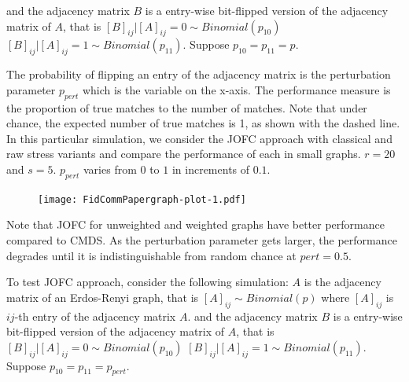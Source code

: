 \documentclass[12pt,oneside,final]{thesis}\usepackage[]{graphicx}\usepackage[]{color}
\begin{document}
   and the adjacency matrix  $B$ is a entry-wise bit-flipped version of the adjacency matrix of $A$, that is
   $\left[B\right]_{ij}|\left[A\right]_{ij}=0 \sim Binomial(p_{10})$ $\left[B\right]_{ij}|\left[A\right]_{ij}=1 \sim Binomial(p_{11})$. Suppose $p_{10}=p_{11}=p$.
  
  The probability of flipping an entry of the adjacency matrix is the perturbation parameter $p_{pert}$ which is the variable on the x-axis. 
  The performance measure is the proportion of true matches to the number of matches. Note that 
  under chance, the expected number of true matches is 1, as shown with the dashed line. In this particular simulation, we consider the JOFC approach with classical and raw stress variants and compare the performance of each in small graphs. $r=20$ and $s=5$. $p_{pert}$ varies from $0$ to $1$ in increments of $0.1$.  
  
\begin{figure}
  \texttt{[image: FidCommPapergraph-plot-1.pdf]}
\end{figure}












Note that JOFC for unweighted and weighted graphs  have better performance compared to CMDS. As the perturbation parameter gets larger, the performance degrades until it is indistinguishable from random chance at $pert=0.5$.

 
  To test JOFC approach, consider the following simulation: $A$ is the adjacency matrix of an Erdos-Renyi graph, that is
  $\left[A\right]_{ij} \sim Binomial(p)$ where $\left[A\right]_{ij}$ is $ij$-th entry of the adjacency matrix  $A$.
   and the adjacency matrix  $B$ is a entry-wise bit-flipped version of the adjacency matrix of $A$, that is
    $\left[B\right]_{ij}|\left[A\right]_{ij}=0 \sim Binomial(p_{10})$ $\left[B\right]_{ij}|\left[A\right]_{ij}=1 \sim Binomial(p_{11})$. Suppose $p_{10}=p_{11}=p_{pert}$.
  
\end{document}
